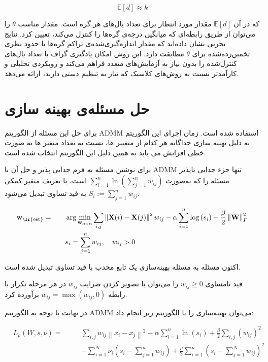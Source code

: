 \documentclass[10pt,twocolumn,a4paper]{article}
\begin{document}
	\[
		\mathbb{E}[d] \approx k
	\]

	که در آن \( \mathbb{E}[d] \) مقدار مورد انتظار برای تعداد یال‌های هر گره است. مقدار مناسب \( \theta \) را می‌توان از طریق رابطه‌ای که میانگین درجه‌ی گره‌ها را کنترل می‌کند، تعیین کرد. نتایج تجربی نشان داده‌اند که مقدار اندازه‌گیری‌شده‌ی تراکم گره‌ها با حدود نظری تخمین‌زده‌شده برای \( \theta \) مطابقت دارد. این روش امکان یادگیری گراف با تعداد یال‌های کنترل‌شده را بدون نیاز به آزمایش‌های متعدد فراهم می‌کند و رویکردی تحلیلی و کارآمدتر نسبت به روش‌های کلاسیک که نیاز به تنظیم دستی دارند، ارائه می‌دهد.


	\section{حل مسئله‌ی بهینه سازی}
	
	برای حل این مسئله از الگوریتم ADMM استفاده شده است. زمان اجرای این الگوریتم به دلیل بهینه سازی جداگانه هر کدام از متغییر ها، نسبت به تعداد متغیر ها به صورت خطی افزایش می یابد به همین دلیل این الگوریتم انتخاب شده است.

	برای نوشتن مسئله به فرم جدایی پذیر و حل آن با ADMM تنها جزء جدایی ناپذیر
	مسئله را که به‌صورت
	$
	\sum_{l=1}^{n} \ln \left( \sum_{j=1}^{n} w_{ij} \right)
	$
است، با تعریف متغیر کمکی 	$S_i := \sum_{j=1}^{n} w_{ij}$	به قید تساوی تبدیل می‌شود.

	\begin{equation}\label{eq:opt2}
		\begin{aligned}
			& \mathbf{w_{\text{\lr{est}}}} = &\quad &\arg \min_{\mathbf{w_{n \times n}}}\sum_{i,j} \left\| \mathbf{X}(i) - \mathbf{X}(j) \right\|^2 w_{ij}
			- \alpha \sum_{i=1}^{n} \log \left( s_i \right) + \frac{\beta}{2} \left\| \mathbf{W} \right\|_F^2 \\
			& &\quad & s_i = \sum_{j=1}^{n} w_{ij}, \quad w_{ij} > 0
		\end{aligned}
	\end{equation}

	اکنون مسئله به مسئله بهینه‌سازی یک تابع محدب با قید تساوی تبدیل شده است.

 	قید نامساوی $w_{ij} \geq 0$ را می‌توان با تصویر کردن ضرایب \( w_{ij} \)
	در هر مرحله تکرار با رابطه $w_{ij} = \max(w_{ij}, 0)$ برآورده کرد.

	در نهایت با توجه به الگوریتم ADMM می‌توان بهینه‌سازی را با الگوریتم زیر انجام داد:

	\begin{equation}\label{eq:opt3}
		\begin{aligned}
			&L_{\rho} (W, s, \nu) = &\quad &\sum_{i,j} w_{ij} \left\| x_i - x_j \right\|^2 - \alpha \sum_{l=1}^{n} \ln (s_i) + \frac{\beta}{2} \sum_{i,j} (w_{ij})^2 \\
			& &\quad &+ \sum_{i=1}^{N} \nu_i \left( s_i - \sum_{j=1}^{n} w_{ij} \right) + \frac{\rho}{2} \sum_{i=1}^{n} \left( s_i - \sum_{j=1}^{N} w_{ij} \right)^2
		\end{aligned}
	\end{equation}
\end{document}
